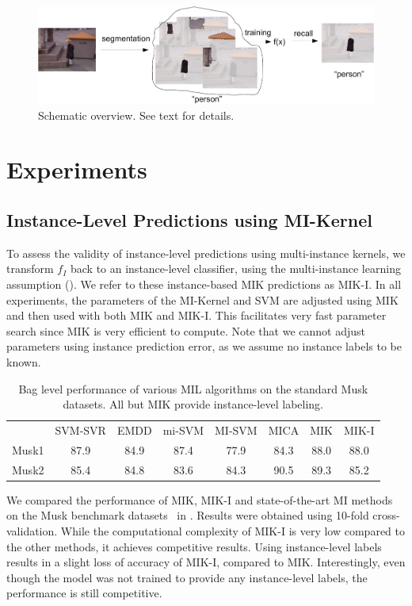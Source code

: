 \begin{figure}[tbp]
	\begin{center}
        \includegraphics[width=\linewidth]{images/scheme-crop.pdf}
	\end{center}
        \caption{Schematic overview. See text for details.}
\end{figure}

\section{Experiments}

\subsection{Instance-Level Predictions using MI-Kernel}

To assess the validity of instance-level predictions using multi-instance
kernels, we transform $f_{I}$ back to an instance-level classifier, using the
multi-instance learning assumption (). We refer to these
instance-based MIK predictions as MIK-I. In all experiments, the
parameters of the MI-Kernel and SVM are adjusted using MIK and then used with
both MIK and MIK-I.  This facilitates very fast parameter search since
MIK is very efficient to compute. Note that we cannot adjust parameters using
instance prediction error, as we assume no instance labels to be known.

\begin{table}
    \centering
    \begin{tabularx}{\linewidth}{@{\extracolsep{\fill}}lccccccc}
    \toprule
        & SVM-SVR & EMDD & mi-SVM & MI-SVM & MICA & MIK & MIK-I \\
    \cmidrule{2-8}
    Musk1 & 87.9 &84.9 &  87.4 &  77.9     & 84.3 & 88.0& 88.0 \\
    Musk2 & 85.4 &84.8 &  83.6 &  84.3     & 90.5 & 89.3& 85.2 \\
    \bottomrule
    \end{tabularx}
    \caption{Bag level performance of various MIL algorithms on the standard Musk
    datasets. All but MIK provide instance-level labeling.}
    
\end{table}
We compared the performance of MIK, MIK-I and state-of-the-art MI
methods on the Musk benchmark datasets~\citep{dietterich1997solving} in
. Results were obtained using 10-fold cross-validation. While
the computational complexity of MIK-I is very low compared to the other
methods, it achieves competitive results.  Using instance-level labels results
in a slight loss of accuracy of MIK-I, compared to MIK\@. Interestingly, even
though the model was not trained to provide any instance-level labels, the
performance is still competitive.

